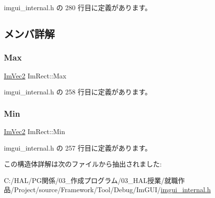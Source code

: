  imgui\+\_\+internal.\+h の 280 行目に定義があります。



\subsection{メンバ詳解}
\mbox{\label{struct_im_rect_aad58c13340d320b350a72a037e3f7628}} 
\subsubsection{\texorpdfstring{Max}{Max}}
{\footnotesize\ttfamily \mbox{\hyperlink{struct_im_vec2}{Im\+Vec2}} Im\+Rect\+::\+Max}



 imgui\+\_\+internal.\+h の 258 行目に定義があります。

\mbox{\label{struct_im_rect_af8f3fbf7ec983e03548b88e14ba68aa8}} 
\subsubsection{\texorpdfstring{Min}{Min}}
{\footnotesize\ttfamily \mbox{\hyperlink{struct_im_vec2}{Im\+Vec2}} Im\+Rect\+::\+Min}



 imgui\+\_\+internal.\+h の 257 行目に定義があります。



この構造体詳解は次のファイルから抽出されました\+:\begin{DoxyCompactItemize}
\item 
C\+:/\+H\+A\+L/\+P\+G関係/03\+\_\+作成プログラム/03\+\_\+\+H\+A\+L授業/就職作品/\+Project/source/\+Framework/\+Tool/\+Debug/\+Im\+G\+U\+I/\mbox{\hyperlink{imgui__internal_8h}{imgui\+\_\+internal.\+h}}\end{DoxyCompactItemize}
